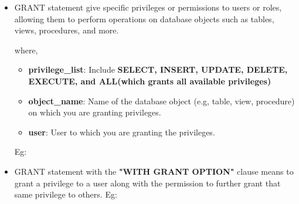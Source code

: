 
\begin{flushleft}
	
	\begin{itemize}
		\item GRANT statement give specific privileges or permissions to users or roles, allowing them to perform operations on database objects such as tables, views, procedures, and more.
		
		where,
		\begin{itemize}
			\item \textbf{privilege\_list}: Include \textbf{SELECT, INSERT, UPDATE, DELETE, EXECUTE, and ALL(which grants all available privileges)}
			
			\item \textbf{object\_name}: Name of the database object (e.g, table, view, procedure) on which you are granting privileges.
			
			\item \textbf{user}: User to which you are granting the privileges.
		\end{itemize}

		Eg:
		\item GRANT statement with the \textbf{"WITH GRANT OPTION"} clause means to grant a privilege to a user along with the permission to further grant that same privilege to others. 
		\newline
		Eg:
		\bigskip
		\newpage
		
	\end{itemize}
	
\end{flushleft}
